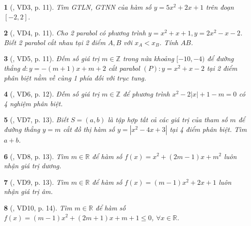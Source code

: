 \documentclass{article}
\newtheorem{baitoan}{}
\begin{document}
\begin{baitoan}[\cite{Hai_Hung_Thu_Tung_ncpt_Toan_10_tap_2}, VD3, p. 11]
	Tìm {\rm GTLN, GTNN} của hàm số $y = 5x^2 + 2x + 1$ trên đoạn $[-2,2]$.
\end{baitoan}

\begin{baitoan}[\cite{Hai_Hung_Thu_Tung_ncpt_Toan_10_tap_2}, VD4, p. 11]
	Cho 2 parabol có phương trình $y = x^2 + x + 1,y = 2x^2 - x - 2$. Biết 2 parabol cắt nhau tại 2 điểm $A,B$ với $x_A < x_B$. Tính $AB$.
\end{baitoan}

\begin{baitoan}[\cite{Hai_Hung_Thu_Tung_ncpt_Toan_10_tap_2}, VD5, p. 11]
	Đếm số giá trị $m\in\mathbb{Z}$ trong nửa khoảng $[-10,-4)$ để đường thẳng $d:y = -(m + 1)x + m + 2$ cắt parabol $(P):y = x^2 + x - 2$ tại 2 điểm phân biệt nằm về cùng 1 phía đối với trục tung.
\end{baitoan}

\begin{baitoan}[\cite{Hai_Hung_Thu_Tung_ncpt_Toan_10_tap_2}, VD6, p. 12]
	Đếm số giá trị $m\in\mathbb{Z}$ để phương trình $x^2 - 2|x| + 1 - m = 0$ có 4 nghiệm phân biệt.
\end{baitoan}

\begin{baitoan}[\cite{Hai_Hung_Thu_Tung_ncpt_Toan_10_tap_2}, VD7, p. 13]
	Biết $S = (a,b)$ là tập hợp tất cả các giá trị của tham số $m$ để đường thẳng $y = m$ cắt đồ thị hàm số $y = |x^2 - 4x + 3|$ tại 4 điểm phân biệt. Tìm $a + b$.
\end{baitoan}

\begin{baitoan}[\cite{Hai_Hung_Thu_Tung_ncpt_Toan_10_tap_2}, VD8, p. 13]
	Tìm $m\in\mathbb{R}$ để hàm số $f(x) = x^2 + (2m - 1)x + m^2$ luôn nhận giá trị dương.
\end{baitoan}

\begin{baitoan}[\cite{Hai_Hung_Thu_Tung_ncpt_Toan_10_tap_2}, VD9, p. 13]
	Tìm $m\in\mathbb{R}$ để hàm số $f(x) = (m - 1)x^2 + 2x + 1$ luôn nhận giá trị âm.
\end{baitoan}

\begin{baitoan}[\cite{Hai_Hung_Thu_Tung_ncpt_Toan_10_tap_2}, VD10, p. 14]
	Tìm $m\in\mathbb{R}$ để hàm số $f(x) = (m - 1)x^2 + (2m + 1)x + m + 1\le0$, $\forall x\in\mathbb{R}$.
\end{baitoan}
\end{document}
